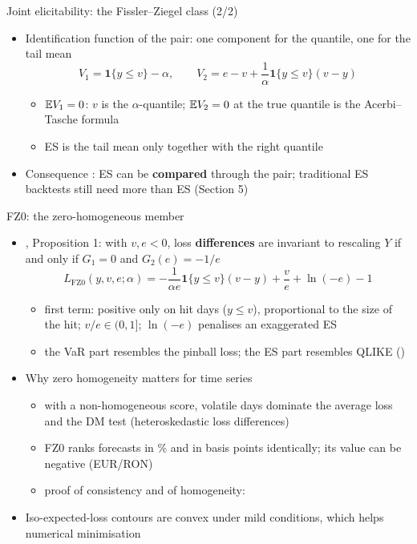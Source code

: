 \begin{frame}{Joint elicitability: the Fissler--Ziegel class (2/2)}
\itemsize{\small}
\begin{itemize}
    \item Identification function of the pair: one component for the quantile, one for the tail mean
    \[ V_1 = \mathbf 1\{y \le v\} - \alpha, \qquad V_2 = e - v + \frac{1}{\alpha}\mathbf 1\{y \le v\}(v - y) \]
    \begin{itemize}
        \item $\mathbb{E} V_1 = 0$: $v$ is the $\alpha$-quantile; $\mathbb{E} V_2 = 0$ at the true quantile is the Acerbi--Tasche formula
        \item ES is the tail mean only together with the right quantile
    \end{itemize}
    \item Consequence : ES can be \textbf{compared} through the pair; traditional ES backtests still need more than ES (Section 5)
\end{itemize}
\end{frame}

\begin{frame}{FZ0: the zero-homogeneous member}
\itemsize{\small}
\begin{itemize}
    \item {}, Proposition 1: with $v, e < 0$, loss \textbf{differences} are invariant to rescaling $Y$ if and only if $G_1 = 0$ and $G_2(e) = -1/e$
    \[ L_{\mathrm{FZ0}}(y, v, e; \alpha) = -\frac{1}{\alpha e}\mathbf 1\{y \le v\}(v - y) + \frac{v}{e} + \ln(-e) - 1 \]
    \begin{itemize}
        \item first term: positive only on hit days ($y \le v$), proportional to the size of the hit; $v/e \in (0, 1]$; $\ln(-e)$ penalises an exaggerated ES
        \item the VaR part resembles the pinball loss; the ES part resembles QLIKE ()
    \end{itemize}
    \item Why zero homogeneity matters for time series
    \begin{itemize}
        \item with a non-homogeneous score, volatile days dominate the average loss and the DM test (heteroskedastic loss differences)
        \item FZ0 ranks forecasts in \% and in basis points identically; its value can be negative (EUR/RON)
        \item proof of consistency and of homogeneity:   %
    \end{itemize}
    \item Iso-expected-loss contours are convex under mild conditions, which helps numerical minimisation 
\end{itemize}
\end{frame}

